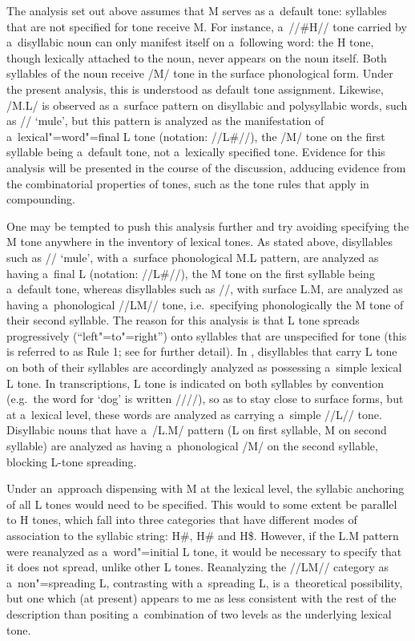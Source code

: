 {{{{{The analysis set out above assumes that M serves as a~default tone: syllables that are not specified for
tone receive M. For instance, a~\mbox{//\#H//} tone carried by a~disyllabic noun can only manifest itself
on a~following word: the H tone, though lexically attached to the noun, never appears on the noun
itself. Both syllables of the noun receive /M/ tone in the surface phonological form. Under the
present analysis, this is understood as default tone assignment. Likewise, /M.L/ is observed as
a~surface pattern on disyllabic and polysyllabic words, such as // ‘mule’, but this
pattern is analyzed as the manifestation of a~lexical"=word"=final L tone (notation: //L\#//), the /M/
tone on the first syllable being a~default tone, not a~lexically specified tone. Evidence for this
analysis will be presented in the course of the discussion, adducing evidence from the combinatorial properties
of tones, such as the tone rules that apply in compounding.

One may be tempted to push this analysis further and try avoiding specifying the M tone anywhere in
the inventory of lexical tones. As stated above, disyllables such as // ‘mule’, with
a~surface phonological M.L pattern, are analyzed as having a~final L (notation: //L\#//), the M tone
on the first syllable being a~default tone, whereas disyllables such as //, with surface
L.M, are analyzed as having a~phonological \mbox{//LM//} tone, i.e.\ specifying phonologically the M tone of
their second syllable. The reason for this analysis is that L tone spreads progressively
(“left"=to"=right”) onto syllables that are unspecified for tone (this is referred to as Rule 1; see
 for further detail). In , disyllables that carry L tone on both of their syllables
are accordingly analyzed as possessing a~simple lexical L tone. In transcriptions, L tone is
indicated on both syllables by convention (e.g.~the word for ‘dog’ is written ////), so as to stay
close to surface forms, but at a~lexical level, these words are analyzed as carrying a~simple //L//
tone. Disyllabic nouns that have a~/L.M/ pattern (L on first syllable, M on second syllable) are
analyzed as having a~phonological /M/ on the second syllable, blocking L-tone spreading.

Under an~approach dispensing with M at the lexical level, the syllabic anchoring of all L tones
would need to be specified. This would to some extent be parallel to H tones, which fall into three categories that have different modes of
association to the syllabic string: H\#, H\# and H\$. However, if the L.M pattern were
reanalyzed as a~word"=initial L tone, it would be necessary to specify that it does not spread,
unlike other L tones. Reanalyzing the \mbox{//LM//} category as a~non"=spreading L, contrasting with
a~spreading L, is a~theoretical possibility, but one which (at present) appears to me as less consistent with the rest of the description than positing a~combination of two levels as the underlying lexical tone. 

}}}}}
